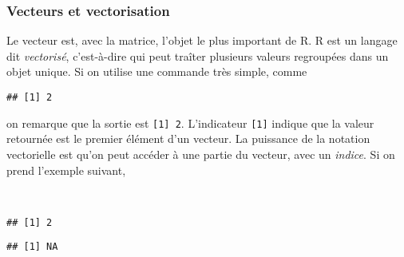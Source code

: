 \subsubsection{Vecteurs et vectorisation}

Le vecteur est, avec la matrice, l'objet le plus important de R.
R est un langage dit \emph{vectorisé}, c'est-à-dire qui peut traîter plusieurs valeurs regroupées dans un objet unique.
Si on utilise une commande très simple, comme

\begin{knitrout}
\color{fgcolor}\begin{kframe}
\begin{flushleft}
\ttfamily\noindent
{}\mbox{}
\normalfont
\end{flushleft}
\begin{verbatim}
## [1] 2
\end{verbatim}
\end{kframe}
\end{knitrout}


\noindent on remarque que la sortie est \texttt{[1] 2}.
L'indicateur \texttt{[1]} indique que la valeur retournée est le premier élément d'un vecteur.
La puissance de la notation vectorielle est qu'on peut accéder à une partie du vecteur, avec un \emph{indice}.
Si on prend l'exemple suivant,

\begin{knitrout}
\color{fgcolor}\begin{kframe}
\begin{flushleft}
\ttfamily\noindent
{}\hlassignement{\usebox{\hlnormalsizeboxlessthan}-}{\ }\hspace*{\fill}\\
\hlstd{}\hlkeyword{[}\hlkeyword{]}\mbox{}
\normalfont
\end{flushleft}
\begin{verbatim}
## [1] 2
\end{verbatim}
\begin{flushleft}
\ttfamily\noindent
{}\hlkeyword{[}\hlkeyword{]}\mbox{}
\normalfont
\end{flushleft}
\begin{verbatim}
## [1] NA
\end{verbatim}
\end{kframe}
\end{knitrout}


